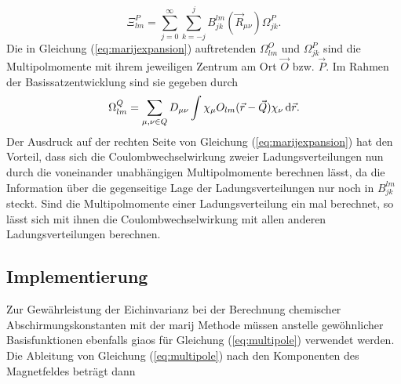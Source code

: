 	\begin{equation}
	\Xi_{lm}^P=\sum_{j=0}^\infty\sum_{k=-j}^jB_{jk}^{lm}(\vec{R}_{\mu\nu})\Omega_{jk}^P.
	\end{equation}
	Die in Gleichung (\ref{eq:marijexpansion}) auftretenden $\Omega_{lm}^O$ und $\Omega_{jk}^P$ sind die Multipolmomente mit ihrem jeweiligen Zentrum am Ort $\vec{O}$ bzw. $\vec{P}$. Im Rahmen der Basissatzentwicklung sind sie gegeben durch
	\begin{equation}\label{eq:multipole}
	\Omega^Q_{lm}=\sum_{\mu,\nu \in Q}D_{\mu\nu}\int\chi_\mu O_{lm}(\vec{r}-\vec{Q})\chi_{\nu}\mathop{}\!\mathrm{d} \vec{r}.
	\end{equation}
	Der Ausdruck auf der rechten Seite von Gleichung (\ref{eq:marijexpansion}) hat den Vorteil, dass sich die Coulombwechselwirkung zweier Ladungsverteilungen nun durch die voneinander unabhängigen Multipolmomente berechnen lässt, da die Information über die gegenseitige Lage der Ladungsverteilungen nur noch in $B_{jk}^{lm}$ steckt. Sind die Multipolmomente einer Ladungsverteilung ein mal berechnet, so lässt sich mit ihnen die Coulombwechselwirkung mit allen anderen Ladungsverteilungen berechnen.\supercite{sierka2003fast} 
	\subsection{Implementierung}
Zur Gewährleistung der Eichinvarianz bei der Berechnung chemischer Abschirmungskonstanten mit der \ac{marij} Methode müssen anstelle gewöhnlicher Basisfunktionen ebenfalls \acp{giao} für Gleichung (\ref{eq:multipole}) verwendet werden. Die Ableitung von Gleichung (\ref{eq:multipole}) nach den Komponenten des Magnetfeldes beträgt dann

